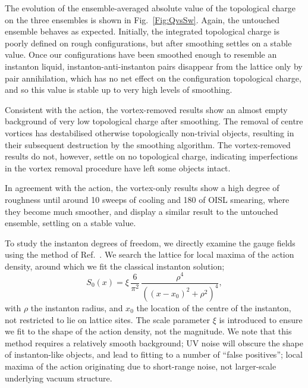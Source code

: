 \documentclass[
 reprint,
 amsmath,amssymb,
 aps,
prd,
]{revtex4-1}
\begin{document}
The evolution of the ensemble-averaged absolute value of the topological charge on the three ensembles is shown in Fig.~\ref{Fig:QvsSw}. Again, the untouched ensemble behaves as expected. Initially, the integrated topological charge is poorly defined on rough configurations, but after smoothing settles on a stable value. Once our configurations have been smoothed enough to resemble an instanton liquid, instanton-anti-instanton pairs disappear from the lattice only by pair annihilation, which has no net effect on the configuration topological charge, and so this value is stable up to very high levels of smoothing. \par
Consistent with the action, the vortex-removed results show an almost empty background of very low topological charge after smoothing. The removal of centre vortices has destabilised otherwise topologically non-trivial objects, resulting in their subsequent destruction by the smoothing algorithm. The vortex-removed results do not, however, settle on no topological charge, indicating imperfections in the vortex removal procedure have left some objects intact.\par
In agreement with the action, the vortex-only results show a high degree of roughness until around 10 sweeps of cooling and 180 of OISL smearing, where they become much smoother, and display a similar result to the untouched ensemble, settling on a stable value. \par
To study the instanton degrees of freedom, we directly examine the gauge fields using the method of Ref.~\cite{Moran:2008qd}. We search the lattice for local maxima of the action density, around which we fit the classical instanton solution;
\begin{equation}
S_{0}(x) = \xi\,\frac{6}{\pi^{2}}\,\frac{\rho^{4}}{((x-x_{0})^{2}+\rho^{2})^{4}},
\end{equation}
with $\rho$ the instanton radius, and $x_{0}$ the location of the centre of the instanton, not restricted to lie on lattice sites. The scale parameter $\xi$ is introduced to ensure we fit to the shape of the action density, not the magnitude. We note that this method requires a relatively smooth background; UV noise will obscure the shape of instanton-like objects, and lead to fitting to a number of ``false positives''; local maxima of the action originating due to short-range noise, not larger-scale underlying vacuum structure. \par
\end{document}
